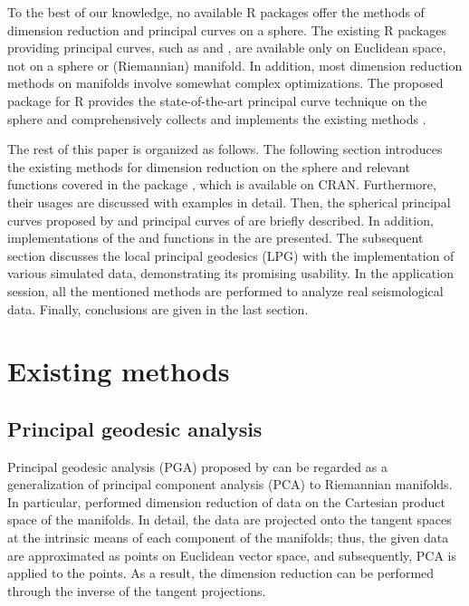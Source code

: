 To the best of our knowledge, no available R packages offer the methods of dimension reduction and principal curves on a sphere. The existing R packages providing principal curves, such as  \citep{princurve} and  \citep{LPCM}, are available only on Euclidean space, not on a sphere or (Riemannian) manifold. In addition, most dimension reduction methods on manifolds \citep{Huckemann2010intrinsic, Panaretos2014, Liu2017level} involve somewhat complex optimizations. The proposed package  for R provides the state-of-the-art principal curve technique on the sphere \citep{Lee2021} and comprehensively collects and implements the existing methods \citep{Fletcher2004, Hauberg2016}.

The rest of this paper is organized as follows. The following section introduces the existing methods for dimension reduction on the sphere and relevant functions covered in the package , which is available on CRAN. Furthermore, their usages are discussed with examples in detail. Then, the spherical principal curves proposed by \cite{Lee2021} and principal curves of \cite{Hauberg2016} are briefly described. In addition, implementations of the  and  functions in the  are presented. The subsequent section discusses the local principal geodesics (LPG) with the implementation of various simulated data, demonstrating its promising usability. In the application session, all the mentioned methods are performed to analyze real seismological data. Finally, conclusions are given in the last section. 


\section{Existing methods}\label{sec:method}
\subsection{Principal geodesic analysis}
Principal geodesic analysis (PGA) proposed by \citet{Fletcher2004} can be regarded as a generalization of principal component analysis (PCA) to Riemannian manifolds. In particular, \citet{Fletcher2004} performed dimension reduction of data on the Cartesian product space of the manifolds. In detail, the data are projected onto the tangent spaces at the intrinsic means of each component of the manifolds; thus, the given data are approximated as points on Euclidean vector space, and subsequently, PCA is applied to the points. As a result, the dimension reduction can be performed through the inverse of the tangent projections. 

